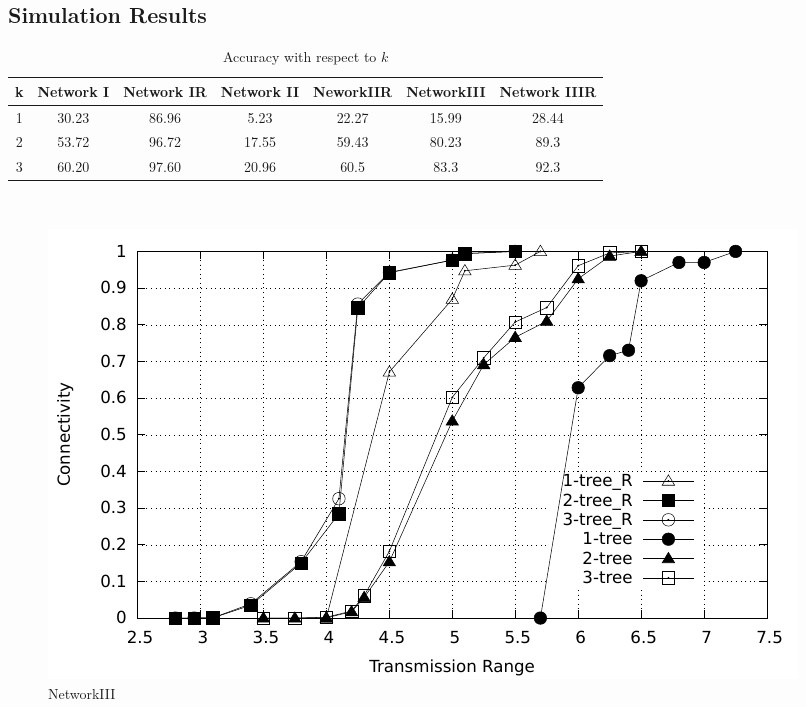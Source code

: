 \documentclass[11pt]{article}
\begin{document}
\subsection{Simulation Results}
\begin{table}
 \begin{minipage}{.5\linewidth}
      \caption{Accuracy with respect to $k$}
      \centering
     \begin{tabular}{|c|c|c|c|c|c|c|}
     \hline
     k & Network I & Network IR & Network II & NeworkIIR & NetworkIII & Network IIIR \\
     \hline
      1 & 30.23 & 86.96 & 5.23 &22.27  &15.99 & 28.44\\\hline
	  2 & 53.72 & 96.72 & 17.55 & 59.43& 80.23&89.3\\\hline
	  3 &60.20 & 97.60 & 20.96 & 60.5& 83.3&92.3\\\hline
\end{tabular}
    \end{minipage}\\
\end{table}   
    \begin{figure}

\begin{minipage}{.9\linewidth}
\includegraphics[width=6 in, height=2.6 in]{NetworkI_woR.pdf}
\caption{NetworkIII}
\end{minipage}

\end{figure}
 

\end{document}
